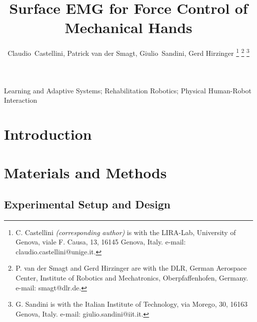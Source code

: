 \documentclass[conference,letterpaper]{IEEEtran}
\begin{document}

\title{Surface EMG for Force Control of\\Mechanical Hands}

\author{Claudio~Castellini, Patrick van der Smagt, Giulio~Sandini, Gerd Hirzinger
\thanks{C. Castellini \emph{(corresponding author)}
  is with the LIRA-Lab, University of Genova,
  viale F. Causa, 13, 16145 Genova, Italy.
  e-mail: claudio.castellini@unige.it.}%
\thanks{P. van der Smagt and Gerd Hirzinger are with the DLR, German Aerospace Center,
  Institute of Robotics and Mechatronics, Oberpfaffenhofen, Germany.
  e-mail: smagt@dlr.de.}%
\thanks{G. Sandini is with the Italian Institute of Technology,
  via Morego, 30, 16163 Genova, Italy.
  e-mail: giulio.sandini@iit.it.}%
}

\maketitle

\begin{abstract}
  
\end{abstract}

\begin{IEEEkeywords}
Learning and Adaptive Systems; Rehabilitation Robotics; Physical
Human-Robot Interaction
\end{IEEEkeywords}

\IEEEpeerreviewmaketitle


\section{Introduction}
\label{sec:introduction}


\section{Materials and Methods}
\label{sec:m&ms}


\subsection{Experimental Setup and Design}
\label{subsec:setup}

\end{document}
